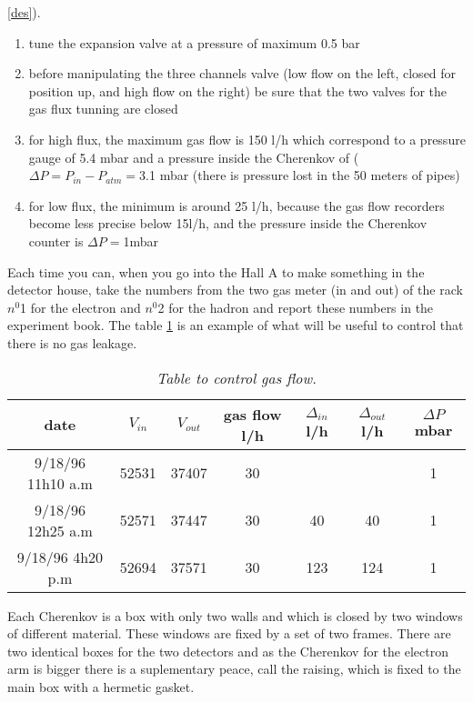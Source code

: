 \documentclass[12pt]{article}
\begin{document}
\ref{des}).
\begin{enumerate}
\item tune the expansion valve at a pressure of maximum 0.5 bar
\item before manipulating the three channels valve (low flow on the left, 
closed for position up, and high flow on the right) be sure that the two valves
for the gas flux tunning are closed
\item for high flux, the maximum gas flow is 150 l/h which correspond 
to a pressure gauge of 5.4 mbar and a pressure inside the Cherenkov of 
($\Delta P=P_{in}-P_{atm}=$3.1 mbar
 (there is pressure lost in the 50 meters of pipes)
\item for low flux, the minimum is around 25 l/h,
 because the gas flow recorders become less precise below 15l/h,
 and the pressure inside the Cherenkov counter 
is $\Delta P=$1mbar
\end{enumerate}
Each time you can, when you go into the Hall A to make something in the
detector house, take the numbers from the two gas meter (in and out) of the
rack $n^0$1 for the electron and $n^0$2 for the hadron and report these
numbers in the experiment book. The table \ref{gamet} is an example of what
will be useful to control that there is no gas leakage.
\begin{table}
\begin{center}
\begin{tabular}{|c|c|c|c|c|c|c|}
\hline
date & $V_{in}$ & $V_{out}$ & gas flow l/h& $\Delta_{in}$ l/h &
 $\Delta_{out}$ l/h & $\Delta P$mbar \\
\hline
9/18/96 11h10 a.m & 52531 & 37407 & 30 & & & 1 \\ 
9/18/96 12h25 a.m & 52571 & 37447 & 30 & 40 & 40 & 1 \\
9/18/96 4h20 p.m & 52694 & 37571 & 30 & 123 & 124 & 1 \\
\hline
\end{tabular}
\label{gamet}
\caption{ {\em Table to control gas flow.}}
\end{center}
\end{table}

\newpage
{}
\label{cons}
Each Cherenkov is a box with only two walls and which is closed by two windows 
of different material. These windows are fixed by a set of two frames. There
are two identical boxes for the two detectors and as the Cherenkov for the 
electron arm is bigger there is a suplementary peace, call the raising, which
is fixed to the main box with a hermetic gasket.  
\end{document}
